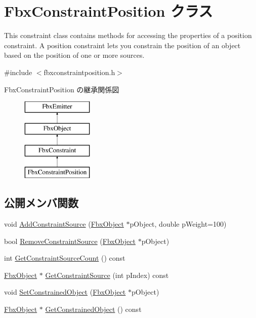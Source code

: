 \hypertarget{class_fbx_constraint_position}{}\section{Fbx\+Constraint\+Position クラス}
\label{class_fbx_constraint_position}


This constraint class contains methods for accessing the properties of a position constraint. A position constraint lets you constrain the position of an object based on the position of one or more sources.  




{\ttfamily \#include $<$fbxconstraintposition.\+h$>$}

Fbx\+Constraint\+Position の継承関係図\begin{figure}[H]
\begin{center}
\leavevmode
\includegraphics[height=4.000000cm]{class_fbx_constraint_position}
\end{center}
\end{figure}
\subsection*{公開メンバ関数}
\begin{DoxyCompactItemize}
\item 
void \hyperlink{class_fbx_constraint_position_a887955c9fefa271dcabb46e2c61ca9e1}{Add\+Constraint\+Source} (\hyperlink{class_fbx_object}{Fbx\+Object} $\ast$p\+Object, double p\+Weight=100)
\item 
bool \hyperlink{class_fbx_constraint_position_a7d496553504b797425ca2a055212f2ad}{Remove\+Constraint\+Source} (\hyperlink{class_fbx_object}{Fbx\+Object} $\ast$p\+Object)
\item 
int \hyperlink{class_fbx_constraint_position_a5f6c49200df6a7a1fe704084c2b56e09}{Get\+Constraint\+Source\+Count} () const
\item 
\hyperlink{class_fbx_object}{Fbx\+Object} $\ast$ \hyperlink{class_fbx_constraint_position_a0024d10c8464eba13d5f3c3037e973cf}{Get\+Constraint\+Source} (int p\+Index) const
\item 
void \hyperlink{class_fbx_constraint_position_a7a2604a668ec7cc7d0c04fd9cf29a01a}{Set\+Constrained\+Object} (\hyperlink{class_fbx_object}{Fbx\+Object} $\ast$p\+Object)
\item 
\hyperlink{class_fbx_object}{Fbx\+Object} $\ast$ \hyperlink{class_fbx_constraint_position_a2722540075ef79aa2d14e7e838afaf79}{Get\+Constrained\+Object} () const
\end{DoxyCompactItemize}
